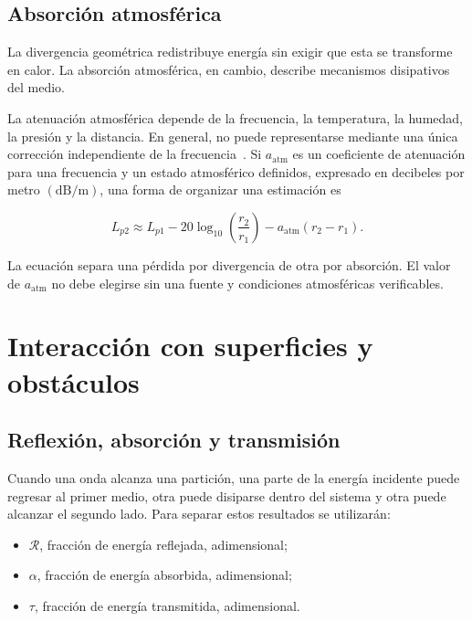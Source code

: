 \subsection{Absorción atmosférica}
\label{sec:u9-absorcion-atmosferica}

La divergencia geométrica redistribuye energía sin exigir que esta se
transforme en calor. La absorción atmosférica, en cambio, describe mecanismos
disipativos del medio.

La atenuación atmosférica depende de la frecuencia, la temperatura,
la humedad, la presión y la distancia. En general, no puede representarse
mediante una única corrección independiente de la frecuencia~\cite{xiangBlauert2021,iso9613_1_1993}. Si
\(a_\mathrm{atm}\) es un coeficiente de atenuación para una frecuencia y un
estado atmosférico definidos, expresado en decibeles por metro
\((\text{dB}/\text{m})\), una forma de organizar una estimación es

\begin{equation}
    L_{p2}
      \approx L_{p1}
      -20\log_{10}\!\left(\frac{r_2}{r_1}\right)
      -a_\mathrm{atm}(r_2-r_1).
    \label{eq:u9-distancia-absorcion-atmosferica}
\end{equation}

La ecuación separa una pérdida por divergencia de otra por absorción. El valor
de \(a_\mathrm{atm}\) no debe elegirse sin una fuente y condiciones
atmosféricas verificables.

\section{Interacción con superficies y obstáculos}
\label{sec:u9-superficies}

\subsection{Reflexión, absorción y transmisión}
\label{sec:u9-reflexion-absorcion-transmision}

Cuando una onda alcanza una partición, una parte de la energía incidente puede
regresar al primer medio, otra puede disiparse dentro del sistema y otra puede
alcanzar el segundo lado. Para separar estos resultados se utilizarán:

\begin{itemize}
    \item \(\mathcal{R}\), fracción de energía reflejada, adimensional;
    \item \(\alpha\), fracción de energía absorbida, adimensional;
    \item \(\tau\), fracción de energía transmitida, adimensional.
\end{itemize}


